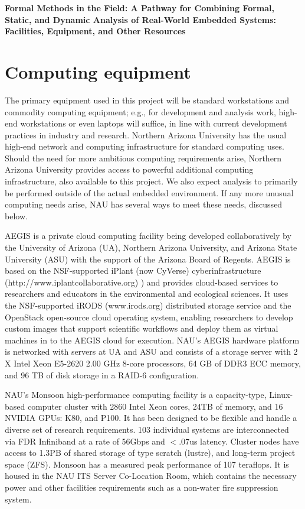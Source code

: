 \documentclass{article}
\begin{document}
\begin{center}
{\Large\sf\textbf{Formal Methods in the Field: A Pathway for Combining Formal, Static, and Dynamic Analysis of Real-World Embedded Systems: Facilities, Equipment, and Other Resources}}
\end{center}

\section*{Computing equipment}

The primary equipment used in this project will be standard workstations and commodity computing equipment; e.g., for development and analysis work, high-end workstations or even laptops will suffice, in line with current development practices in industry and research. Northern Arizona University has the usual high-end network and computing infrastructure for standard computing uses.  Should the need for more ambitious computing requirements arise, Northern Arizona University provides access to powerful additional computing infrastructure, also available to this project.  We also expect analysis to primarily be performed outside of the actual embedded environment.  If any more unusual computing needs arise, NAU has several ways to meet these needs, discussed below.

AEGIS is a private cloud computing facility being developed collaboratively by the University of Arizona (UA), Northern Arizona University, and Arizona State University (ASU) with the support of the Arizona Board of Regents. AEGIS is based on the NSF-supported iPlant (now CyVerse) cyberinfrastructure (http://www.iplantcollaborative.org) ) and provides cloud-based services to researchers and educators in the environmental and ecological sciences. It uses the NSF-supported iRODS (www.irods.org) distributed storage service and the OpenStack open-source cloud operating system, enabling researchers to develop custom images that support scientific workflows and deploy them as virtual machines in to the AEGIS cloud for execution. NAU’s AEGIS hardware platform is networked with servers at UA and ASU and consists of a storage server with 2 X Intel Xeon E5-2620 2.00 GHz 8-core processors, 64 GB of DDR3 ECC memory, and 96 TB of disk storage in a RAID-6 configuration.

NAU’s Monsoon high-performance computing facility is a capacity-type, Linux-based computer cluster with 2860 Intel Xeon cores, 24TB of memory, and 16 NVIDIA GPUs: K80, and P100. It has been designed to be flexible and handle a diverse set of research requirements. 103 individual systems are interconnected via FDR Infiniband at a rate of 56Gbps and $<.07$us latency. Cluster nodes have access to 1.3PB of shared storage of type scratch (lustre), and long-term project space (ZFS). Monsoon has a measured peak performance of 107 teraflops. It is housed in the NAU ITS Server Co-Location Room, which contains the necessary power and other facilities requirements such as a non-water fire suppression system.
\end{document}

